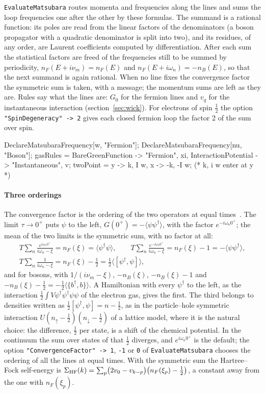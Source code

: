 \documentclass[11pt,a4paper]{article}
\newcommand{\pkg}[1]{\texttt{#1}}
\begin{document}
\pkg{EvaluateMatsubara} routes momenta and frequencies along the lines and sums the loop frequencies one after the
other by these formulas. The summand is a rational function: its poles are read from the linear factors of the
denominators (a boson propagator with a quadratic denominator is split into two), and its residues, of any order, are
Laurent coefficients computed by differentiation. After each sum the statistical factors are freed of the frequencies
still to be summed by periodicity, $n_F(E+i\nu_m)=n_F(E)$ and $n_F(E+i\omega_n)=-n_B(E)$, so that the next summand is
again rational. When no line fixes the convergence factor the symmetric sum is taken, with a message; the momentum sums
are left as they are. Rules say what the lines are: $G_0$ for the fermion lines and $v_q$ for the instantaneous
interaction (section~\ref{sec:wick}). For
electrons of spin $\frac12$ the option \pkg{"SpinDegeneracy" -> 2} gives each closed fermion loop the factor 2 of the sum
over spin.
\begin{code}
DeclareMatsubaraFrequency[w, "Fermion"]; DeclareMatsubaraFrequency[nu, "Boson"];
gasRules = {BareGreenFunction -> {"Fermion", xi},
    InteractionPotential -> {"Instantaneous", v}};
twoPoint = {y -> {k, I w}, x -> {-k, -I w}};   (* k, i w enter at y *)
\end{code}

\paragraph{Three orderings} The convergence factor is the ordering of the two operators at equal times~\cite{NegeleOrland}.
The limit $\tau\to0^+$ puts $\psi$ to the left, $G(0^+)=-\langle\psi\psi^\dagger\rangle$, with the factor
$e^{-i\omega_n0^+}$; the mean of the two limits is the symmetric sum, with no factor at all:
\begin{gather*}
T\sum_n\frac{e^{i\omega_n0^+}}{i\omega_n-\xi}=n_F(\xi)=\langle\psi^\dagger\psi\rangle,\qquad
T\sum_n\frac{e^{-i\omega_n0^+}}{i\omega_n-\xi}=n_F(\xi)-1=-\langle\psi\psi^\dagger\rangle,\\
T\sum_n\frac{1}{i\omega_n-\xi}=n_F(\xi)-\tfrac12=\tfrac12\langle[\psi^\dagger,\psi]\rangle,
\end{gather*}
and for bosons, with $1/(i\nu_m-\xi)$, $-n_B(\xi)$, $-n_B(\xi)-1$ and $-n_B(\xi)-\frac12=-\frac12\langle\{b^\dagger,b\}\rangle$.
A Hamiltonian with every $\psi^\dagger$ to the left, as the interaction
$\frac12\int V\psi^\dagger\psi^\dagger\psi\psi$ of the electron gas, gives the first. The third
belongs to densities written as $\frac12[\psi^\dagger,\psi]=n-\frac12$, as in the particle--hole symmetric
interaction $U(n_\uparrow-\frac12)(n_\downarrow-\frac12)$ of a lattice model, where it is the natural choice: the
difference, $\frac12$ per state, is a shift of the chemical potential. In the continuum the sum over states of that
$\frac12$ diverges, and $e^{i\omega_n0^+}$ is the default; the option \pkg{"ConvergenceFactor" -> 1}, \pkg{-1} or
\pkg{0} of \pkg{EvaluateMatsubara} chooses the ordering of all the lines at equal times. With the symmetric sum the
Hartree--Fock self-energy is
$\Sigma_{\rm HF}(k)=\sum_p\bigl(2v_0-v_{k-p}\bigr)\bigl(n_F(\xi_p)-\frac12\bigr)$, a constant away from the one with
$n_F(\xi_p)$.
\end{document}
